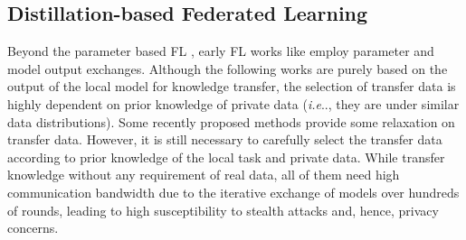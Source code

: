 \documentclass[letterpaper]{article} %
\makeatletter
\DeclareRobustCommand\onedot{\futurelet\@let@token\@onedot}
\def\@onedot{\ifx\@let@token.\else.\null\fi\xspace}
\def\ie{\emph{i.e}\onedot} \def\Ie{\emph{I.e}\onedot}
\makeatother
\begin{document}
\subsection{Distillation-based Federated Learning}


Beyond the parameter based FL \cite{mcmahan2017communication, hsu2019measuring,li2018federated}, early FL works like \cite{jeong2018communication} employ parameter and model output exchanges. Although the following works \cite{li2019fedmd, chang2019cronus, li2021practical} are purely based on the output of the local model for knowledge transfer, the selection of transfer data is highly dependent on prior knowledge of private data (\ie, they are under similar data distributions). Some recently proposed methods \cite{lin2020ensemble, gong2022preserving} provide some relaxation on transfer data. However, it is still necessary to carefully select the transfer data according to prior knowledge of the local task and private data.
While \cite{zhu2021data, zhang2022fedzkt, zhang2022fine} transfer knowledge without any requirement of real data, all of them need high communication bandwidth due to the iterative exchange of models over hundreds of rounds, leading to high susceptibility to stealth attacks and, hence, privacy concerns.
\end{document}
